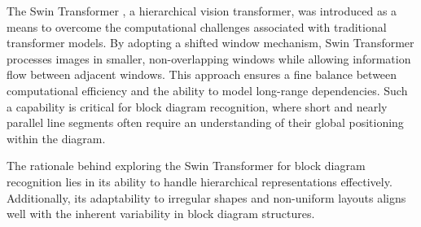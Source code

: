 The Swin Transformer \cite{liu_2021_swin}, a hierarchical vision transformer, was introduced as a means to overcome the computational challenges associated with traditional transformer models. By adopting a shifted window mechanism, Swin Transformer processes images in smaller, non-overlapping windows while allowing information flow between adjacent windows. This approach ensures a fine balance between computational efficiency and the ability to model long-range dependencies. Such a capability is critical for block diagram recognition, where short and nearly parallel line segments often require an understanding of their global positioning within the diagram.

The rationale behind exploring the Swin Transformer for block diagram recognition lies in its ability to handle hierarchical representations effectively. Additionally, its adaptability to irregular shapes and non-uniform layouts aligns well with the inherent variability in block diagram structures.

 

 

 



